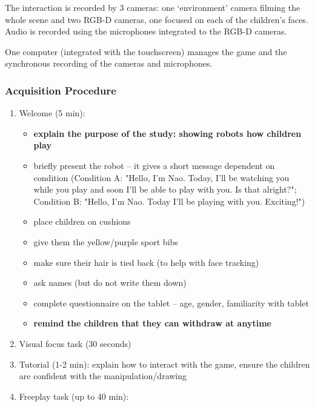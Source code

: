 \documentclass{article}
\begin{document}
The interaction is recorded by 3 cameras: one `environment' camera
filming the whole scene and two RGB-D cameras, one focused on each of the
children's faces. Audio is recorded using the microphones integrated to the RGB-D cameras. 

One computer (integrated with the touchscreen) manages the game and the
synchronous recording of the cameras and microphones.

\subsubsection{Acquisition Procedure}


\begin{enumerate}
\def\labelenumi{\arabic{enumi}.}
\item
  Welcome (5 min):

  \begin{itemize}
  \item
    \textbf{explain the purpose of the study: showing robots how
    children play}
    \item
    briefly present the robot -- it gives a short message dependent on condition (Condition A: "Hello, I'm Nao. Today, I'll be watching you while you play and soon I'll be able to play with you. Is that alright?"; Condition B: "Hello, I'm Nao. Today I'll be playing with you. Exciting!")
  \item
    place children on cushions
  \item
    give them the yellow/purple sport bibs
  \item
    make sure their hair is tied back (to help with face tracking)
  \item
    ask names (but do not write them down)
  \item
     complete questionnaire on the tablet -- age, gender, familiarity with
    tablet
  \item
    \textbf{remind the children that they can withdraw at anytime}
 
  \end{itemize}
\item
  Visual focus task (30 seconds)
\item
  Tutorial (1-2 min): explain how to interact with the game, ensure the
  children are confident with the manipulation/drawing
\item
  Freeplay task (up to 40 min):


\end{enumerate}
\end{document}

